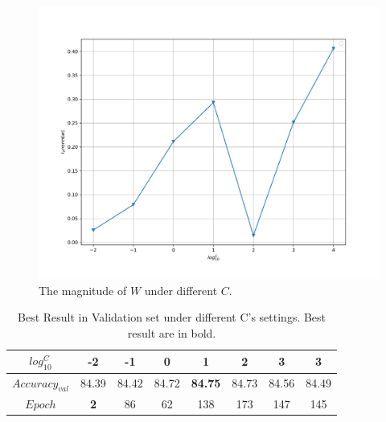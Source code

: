 \documentclass[journal, a4paper]{IEEEtran}
\begin{document}
\begin{figure}[!hbt]
	\begin{center}
		\includegraphics[width=\columnwidth]{c_magnitude}
		\caption{The magnitude of $W$ under different $C$.}
		\label{fig:c_mag}
	\end{center}
\end{figure} \par

\begin{table}[!hbt]
	\begin{center}
		\caption{Best Result in Validation set under different C's settings. Best result are in bold.}
		\label{tab:C_performance}
		\begin{tabular}{|c|c|c|c|c|c|c|c|}
			\hline
			$log_{10}^{C}$ & -2 & -1 & 0 & 1 & 2 & 3 & 3 \\
			\hline
			$Accuracy_{val}$   & 84.39 & 84.42 & 84.72 & \textbf{84.75} & 84.73 & 84.56 & 84.49   \\
			\hline
			$Epoch$  & \textbf{2} & 86 & 62 & 138 & 173 & 147 & 145   \\
			\hline
		\end{tabular}
	\end{center}
\end{table}
\end{document}
